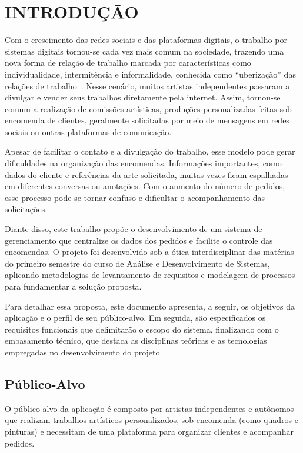 \chapter{INTRODUÇÃO}

Com o crescimento das redes sociais e das plataformas digitais, o trabalho por 
sistemas digitais tornou-se cada vez mais comum na sociedade, trazendo uma nova forma 
de relação de trabalho marcada por características como individualidade, 
intermitência e informalidade, conhecida como ``uberização'' das relações de 
trabalho~\cite{abilio2020}. Nesse cenário, muitos artistas independentes passaram a divulgar e 
vender seus trabalhos diretamente pela internet. Assim, tornou-se comum a realização
de comissões artísticas, produções personalizadas feitas sob encomenda de clientes,
geralmente solicitadas por meio de mensagens em redes sociais ou outras plataformas 
de comunicação.

Apesar de facilitar o contato e a divulgação do trabalho, esse modelo pode gerar 
dificuldades na organização das encomendas. Informações importantes, como dados 
do cliente e referências da arte solicitada, muitas vezes ficam espalhadas em 
diferentes conversas ou anotações. Com o aumento do número de pedidos, esse 
processo pode se tornar confuso e dificultar o acompanhamento das solicitações. 

Diante disso, este trabalho propõe o desenvolvimento de um sistema de gerenciamento 
que centralize os dados dos pedidos e facilite o controle das encomendas. O projeto 
foi desenvolvido sob a ótica interdisciplinar das matérias do primeiro semestre do 
curso de Análise e Desenvolvimento de Sistemas, aplicando metodologias de 
levantamento de requisitos e modelagem de processos para fundamentar a solução proposta.

Para detalhar essa proposta, este documento apresenta, a seguir, os objetivos da 
aplicação e o perfil de seu público-alvo. Em seguida, são especificados os requisitos 
funcionais que delimitarão o escopo do sistema, finalizando com o embasamento técnico,
que destaca as disciplinas teóricas e as tecnologias empregadas no desenvolvimento do
projeto.

\section{Público-Alvo}
O público-alvo da aplicação é composto por artistas independentes e autônomos 
que realizam trabalhos artísticos personalizados, sob encomenda 
(como quadros e pinturas) e necessitam de uma plataforma
para organizar clientes e acompanhar pedidos.

